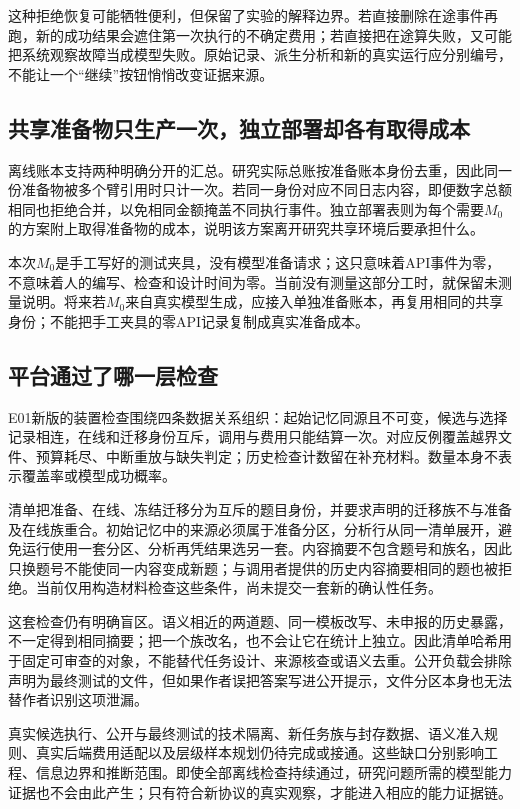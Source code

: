 这种拒绝恢复可能牺牲便利，但保留了实验的解释边界。若直接删除在途事件再跑，新的成功结果会遮住第一次执行的不确定费用；若直接把在途算失败，又可能把系统观察故障当成模型失败。原始记录、派生分析和新的真实运行应分别编号，不能让一个“继续”按钮悄悄改变证据来源。

\subsection{共享准备物只生产一次，独立部署却各有取得成本}

离线账本支持两种明确分开的汇总。研究实际总账按准备账本身份去重，因此同一份准备物被多个臂引用时只计一次。若同一身份对应不同日志内容，即便数字总额相同也拒绝合并，以免相同金额掩盖不同执行事件。独立部署表则为每个需要$M_0$的方案附上取得准备物的成本，说明该方案离开研究共享环境后要承担什么。

本次$M_0$是手工写好的测试夹具，没有模型准备请求；这只意味着API事件为零，不意味着人的编写、检查和设计时间为零。当前没有测量这部分工时，就保留未测量说明。将来若$M_0$来自真实模型生成，应接入单独准备账本，再复用相同的共享身份；不能把手工夹具的零API记录复制成真实准备成本。

\subsection{平台通过了哪一层检查}

E01新版的装置检查围绕四条数据关系组织：起始记忆同源且不可变，候选与选择记录相连，在线和迁移身份互斥，调用与费用只能结算一次。对应反例覆盖越界文件、预算耗尽、中断重放与缺失判定；历史检查计数留在补充材料。数量本身不表示覆盖率或模型成功概率。

清单把准备、在线、冻结迁移分为互斥的题目身份，并要求声明的迁移族不与准备及在线族重合。初始记忆中的来源必须属于准备分区，分析行从同一清单展开，避免运行使用一套分区、分析再凭结果选另一套。内容摘要不包含题号和族名，因此只换题号不能使同一内容变成新题；与调用者提供的历史内容摘要相同的题也被拒绝。当前仅用构造材料检查这些条件，尚未提交一套新的确认性任务。

这套检查仍有明确盲区。语义相近的两道题、同一模板改写、未申报的历史暴露，不一定得到相同摘要；把一个族改名，也不会让它在统计上独立。因此清单哈希用于固定可审查的对象，不能替代任务设计、来源核查或语义去重。公开负载会排除声明为最终测试的文件，但如果作者误把答案写进公开提示，文件分区本身也无法替作者识别这项泄漏。

真实候选执行、公开与最终测试的技术隔离、新任务族与封存数据、语义准入规则、真实后端费用适配以及层级样本规划仍待完成或接通。这些缺口分别影响工程、信息边界和推断范围。即使全部离线检查持续通过，研究问题所需的模型能力证据也不会由此产生；只有符合新协议的真实观察，才能进入相应的能力证据链。


